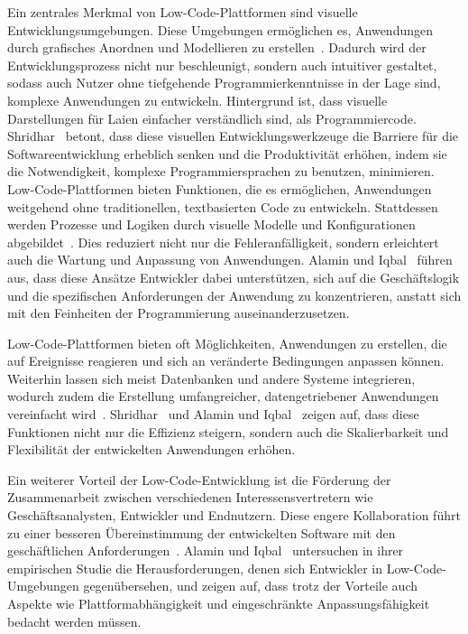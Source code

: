 Ein zentrales Merkmal von Low-Code-Plattformen sind visuelle Entwicklungsumgebungen. Diese Umgebungen ermöglichen 
es, Anwendungen durch grafisches Anordnen und Modellieren zu erstellen~\cite{Bock_2021}. Dadurch wird 
der Entwicklungsprozess nicht nur beschleunigt, sondern auch intuitiver gestaltet, sodass auch Nutzer ohne 
tiefgehende Programmierkenntnisse in der Lage sind, komplexe Anwendungen zu entwickeln. Hintergrund ist, dass 
visuelle Darstellungen für Laien einfacher verständlich sind, als Programmiercode. Shridhar~\cite{Shridhar_2021} betont, 
dass diese visuellen Entwicklungswerkzeuge die Barriere für die Softwareentwicklung erheblich senken und die 
Produktivität erhöhen, indem sie die Notwendigkeit, komplexe Programmiersprachen zu benutzen, minimieren.
Low-Code-Plattformen bieten Funktionen, die es ermöglichen, Anwendungen weitgehend ohne traditionellen, 
textbasierten Code zu entwickeln. Stattdessen werden Prozesse und Logiken durch visuelle Modelle und 
Konfigurationen abgebildet~\cite{Bock_2021}. Dies reduziert nicht nur die Fehleranfälligkeit, sondern 
erleichtert auch die Wartung und Anpassung von Anwendungen. Alamin und Iqbal~\cite{Alamin_2021} 
führen aus, dass diese Ansätze Entwickler dabei unterstützen, sich auf die Geschäftslogik und die spezifischen Anforderungen 
der Anwendung zu konzentrieren, anstatt sich mit den Feinheiten der Programmierung auseinanderzusetzen.

Low-Code-Plattformen bieten oft Möglichkeiten, Anwendungen zu erstellen, die auf Ereignisse reagieren und sich 
an veränderte Bedingungen anpassen können. Weiterhin lassen sich meist Datenbanken und andere Systeme integrieren, 
wodurch zudem die Erstellung umfangreicher, datengetriebener Anwendungen vereinfacht wird~\cite{Bock_2021}. 
Shridhar~\cite{Shridhar_2021} und Alamin und Iqbal~\cite{Alamin_2021} zeigen auf, dass diese 
Funktionen nicht nur die Effizienz steigern, sondern auch die Skalierbarkeit und Flexibilität 
der entwickelten Anwendungen erhöhen.

Ein weiterer Vorteil der Low-Code-Entwicklung ist die Förderung der Zusammenarbeit zwischen verschiedenen 
Interessensvertretern wie Geschäftsanalysten, Entwickler und Endnutzern. Diese engere Kollaboration führt zu 
einer besseren Übereinstimmung der entwickelten Software mit den geschäftlichen Anforderungen~\cite{Shridhar_2021}. 
Alamin und Iqbal~\cite{Alamin_2021} untersuchen in ihrer empirischen 
Studie die Herausforderungen, denen sich Entwickler in Low-Code-Umgebungen gegenübersehen, und zeigen auf, dass trotz 
der Vorteile auch Aspekte wie Plattformabhängigkeit und eingeschränkte Anpassungsfähigkeit bedacht werden müssen.

